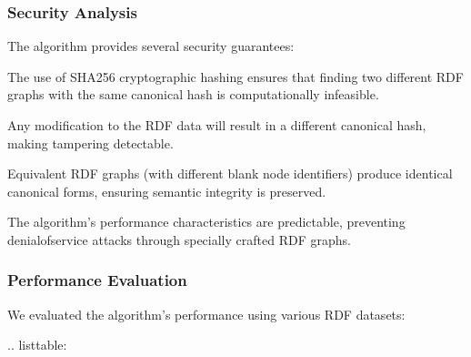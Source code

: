 \documentclass[letterpaper,10pt,english]{sphinxmanual}
\begin{document}
\subsubsection{Security Analysis}
\label{\detokenize{research/rdf-canonicalization-algorithm:security-analysis}}
\sphinxAtStartPar
The algorithm provides several security guarantees:
\begin{description}
\sphinxAtStartPar
The use of SHA\sphinxhyphen{}256 cryptographic hashing ensures that finding two different RDF graphs with the same canonical hash is computationally infeasible.

\sphinxAtStartPar
Any modification to the RDF data will result in a different canonical hash, making tampering detectable.

\sphinxAtStartPar
Equivalent RDF graphs (with different blank node identifiers) produce identical canonical forms, ensuring semantic integrity is preserved.

\sphinxAtStartPar
The algorithm’s performance characteristics are predictable, preventing denial\sphinxhyphen{}of\sphinxhyphen{}service attacks through specially crafted RDF graphs.

\end{description}


\subsubsection{Performance Evaluation}
\label{\detokenize{research/rdf-canonicalization-algorithm:performance-evaluation}}
\sphinxAtStartPar
We evaluated the algorithm’s performance using various RDF datasets:

\sphinxAtStartPar
{}
.. list\sphinxhyphen{}table:
\end{document}
